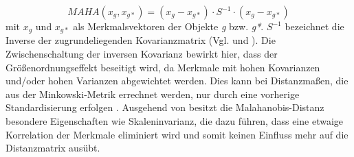 \begin{equation}
MAHA(x_{g},x_{g*}) = (x_{g} - x_{g*}) \cdot S^{-1} \cdot (x_{g} - x_{g*})
\end{equation}
mit $x_{g}$ und $x_{g*}$ als Merkmalsvektoren der Objekte \textit{g} bzw. \textit{g*}. $S^{-1}$ bezeichnet die Inverse der zugrundeliegenden Kovarianzmatrix (Vgl. \citealt[S. 339]{Bacher.2010} und \citealt[S. 168]{Bankhofer.2008}). Die Zwischenschaltung der inversen Kovarianz bewirkt hier, dass der Größenordnungseffekt beseitigt wird, da Merkmale mit hohen Kovarianzen und/oder hohen Varianzen abgewichtet werden. Dies kann bei Distanzmaßen, die aus der Minkowski-Metrik errechnet werden, nur durch eine vorherige Standardisierung erfolgen \citep[Vgl.][S. 214]{Eckey.2002}. Ausgehend von \citet[S. 43/44]{Bock.1974} besitzt die Malahanobis-Distanz besondere Eigenschaften wie Skaleninvarianz, die dazu führen, dass eine etwaige Korrelation der Merkmale eliminiert wird und somit keinen Einfluss mehr auf die Distanzmatrix ausübt. 
